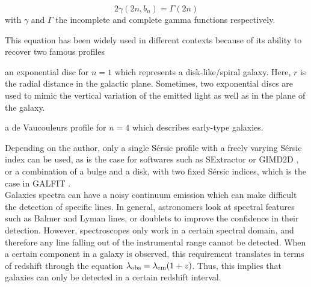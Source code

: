 \begin{equation}
2 \gamma (2n, b_n) = \Gamma (2n)
\end{equation}
with $\gamma$ and $\Gamma$ the incomplete and complete gamma functions respectively.

This equation has been widely used in different contexts because of its ability to recover two famous profiles
\begin{enumerate*}[label={(\alph*)}]
    \item an exponential disc for $n = 1$ which represents a disk-like/spiral galaxy. Here, $r$ is the radial distance in the galactic plane. Sometimes, two exponential discs are used to mimic the vertical variation of the emitted light as well as in the plane of the galaxy. 
    \item a de Vaucouleurs profile for $n = 4$ which describes early-type galaxies.
\end{enumerate*}
Depending on the author, only a single Sérsic profile with a freely varying Sérsic index can be used, as is the case for softwares such as SExtractor  or GIMD2D , or a combination of a bulge and a disk, with two fixed Sérsic indices, which is the case in GALFIT . \\

Galaxies spectra can have a noisy continuum emission which can make difficult the detection of specific lines. In general, astronomers look at spectral features such as Balmer and Lyman lines, or doublets to improve the confidence in their detection. However, spectroscopes only work in a certain spectral domain, and therefore any line falling out of the instrumental range cannot be detected. When a certain component in a galaxy is observed, this requirement translates in terms of redshift through the equation $\lambda_{\rm{obs}} = \lambda_{\rm{em}} ( 1+ z)$. Thus, this implies that galaxies can only be detected in a certain redshift interval. \\

